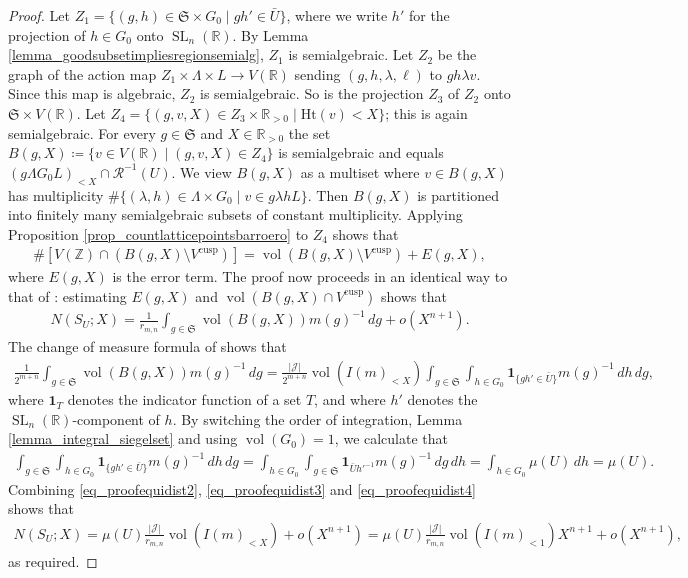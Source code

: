 \documentclass{article} %
\numberwithin{equation}{section}
\DeclareMathOperator{\SL}{SL}
\DeclareMathOperator{\Vol}{vol}
\newcommand{\R}{\mathbb{R}}
\newcommand{\Z}{\mathbb{Z}}
\newcommand{\height}{\mathrm{Ht}}
\newcommand{\Siegel}{\mathfrak{S}}
\begin{document}
\begin{proof}
    Let $Z_1 = \{ (g,h) \in \Siegel \times G_0 \mid gh' \in \bar{U}\}$, where we write $h'$ for the projection of $h \in G_0$ onto $\SL_n(\R)$.
    By Lemma \ref{lemma_goodsubsetimpliesregionsemialg}, $Z_1$ is semialgebraic.
    Let $Z_2$ be the graph of the action map $Z_1\times \Lambda\times L\rightarrow V(\R)$ sending $(g,h,\lambda,\ell)$ to $gh\lambda v$.
    Since this map is algebraic, $Z_2$ is semialgebraic.
    So is the projection $Z_3$ of $Z_2$ onto $\Siegel\times V(\R)$.
    Let $Z_4 = \{(g,v,X) \in Z_3\times \R_{>0}\mid \height(v)< X\}$; this is again semialgebraic.
    For every $g\in \Siegel$ and $X\in \R_{>0}$ the set $B(g,X)\coloneqq \{v \in V(\R)\mid (g,v,X)\in Z_4\}$ is semialgebraic and equals $(g\Lambda G_0 L)_{<X} \cap \mathcal{R}^{-1}(U)$.
    We view $B(g,X)$ as a multiset where $v\in B(g,X)$ has multiplicity $\#\{(\lambda,h) \in \Lambda\times G_0 \mid v \in g\lambda h L \}$.
    Then $B(g,X)$ is partitioned into finitely many semialgebraic subsets of constant multiplicity.
    Applying Proposition \ref{prop_countlatticepointsbarroero} to $Z_4$ shows that 
    \begin{align*}
        \#[V(\Z) \cap (B(g,X)\setminus V^{\text{cusp}})] = \Vol(B(g,X) \setminus V^{\text{cusp}}) + E(g,X),
    \end{align*}
    where $E(g,X)$ is the error term. 
    The proof now proceeds in an identical way to that of \cite[Proposition 15]{bhargava2015mosthyperellipticarepointless}: estimating $E(g,X)$ and $\Vol(B(g,X)\cap V^{\text{cusp}})$ shows that
    \begin{align}\label{eq_proofequidist2}
        N(S_U;X) = \frac{1}{r_{m,n}} \int_{g\in \Siegel} \Vol(B(g,X))m(g)^{-1} \, dg + o(X^{n+1}).
    \end{align}
    The change of measure formula of \cite[Proposition 16]{bhargava2015mosthyperellipticarepointless} shows that 
    \begin{align}\label{eq_proofequidist3}
     \frac{1}{2^{m+n}} \int_{g\in \Siegel} \Vol(B(g,X))m(g)^{-1} \,dg = \frac{|\mathcal{J}|}{2^{m+n}} \Vol(I(m)_{<X})\int_{g \in \Siegel} \int_{h\in G_0}  \mathbf{1}_{\{gh' \in \bar{U}\}} m(g)^{-1} \,dh \,dg,
    \end{align}
    where $\mathbf{1}_T$ denotes the indicator function of a set $T$, and where $h'$ denotes the $\SL_n(\R)$-component of $h$.
    By switching the order of integration, Lemma \ref{lemma_integral_siegelset} and using $\Vol(G_0) = 1$, we calculate that
    \begin{align}\label{eq_proofequidist4}
        \int_{g \in \Siegel} \int_{h\in G_0}  \mathbf{1}_{\{gh' \in \bar{U}\}}m(g)^{-1} \, dh \, dg = \int_{h\in G_0} \int_{g\in \Siegel} \mathbf{1}_{\bar{U}h'^{-1}}m(g)^{-1} \,  dg \, dh = \int_{h\in G_0} \mu(U) \, dh= \mu(U).
    \end{align}
    Combining \eqref{eq_proofequidist2}, \eqref{eq_proofequidist3} and \eqref{eq_proofequidist4} shows that
    \begin{align*}
    N(S_U;X) = \mu(U)\frac{|\mathcal{J}|}{r_{m,n}} \Vol(I(m)_{<X}) +o(X^{n+1})=  \mu(U)\frac{|\mathcal{J}|}{r_{m,n}} \Vol(I(m)_{<1})X^{n+1}+o(X^{n+1}),
    \end{align*}
    as required.
\end{proof}
\end{document}
